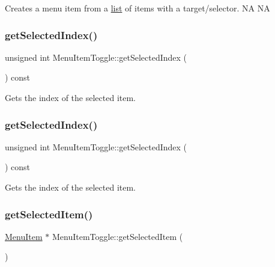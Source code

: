 Creates a menu item from a \hyperlink{protocollist-p}{list} of items with a target/selector.  NA  NA \mbox{\label{classMenuItemToggle_a1483b8a73150e59df0c9aaa9194beba0}} 
\subsubsection{\texorpdfstring{get\+Selected\+Index()}{getSelectedIndex()}\hspace{0.1cm}{\footnotesize\ttfamily [1/2]}}
{\footnotesize\ttfamily unsigned int Menu\+Item\+Toggle\+::get\+Selected\+Index (\begin{DoxyParamCaption}{ }\end{DoxyParamCaption}) const\hspace{0.3cm}{\ttfamily [inline]}}

Gets the index of the selected item. \mbox{\label{classMenuItemToggle_a1483b8a73150e59df0c9aaa9194beba0}} 
\subsubsection{\texorpdfstring{get\+Selected\+Index()}{getSelectedIndex()}\hspace{0.1cm}{\footnotesize\ttfamily [2/2]}}
{\footnotesize\ttfamily unsigned int Menu\+Item\+Toggle\+::get\+Selected\+Index (\begin{DoxyParamCaption}{ }\end{DoxyParamCaption}) const\hspace{0.3cm}{\ttfamily [inline]}}

Gets the index of the selected item. \mbox{\label{classMenuItemToggle_a677a837ba57326e55d8baa8e725f905a}} 
\subsubsection{\texorpdfstring{get\+Selected\+Item()}{getSelectedItem()}\hspace{0.1cm}{\footnotesize\ttfamily [1/2]}}
{\footnotesize\ttfamily \hyperlink{classMenuItem}{Menu\+Item} $\ast$ Menu\+Item\+Toggle\+::get\+Selected\+Item (\begin{DoxyParamCaption}{ }\end{DoxyParamCaption})}

